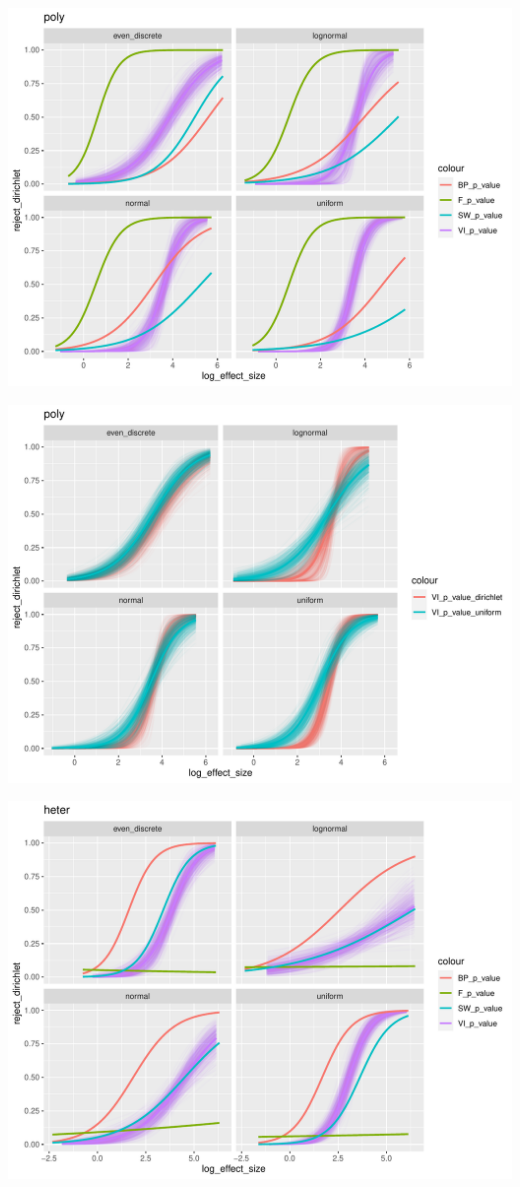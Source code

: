 \documentclass[]{interact}
\theoremstyle{plain}%
\theoremstyle{definition}
\theoremstyle{remark}
\begin{document}
\includegraphics[width=1\linewidth]{paper_comparison_files/figure-latex/unnamed-chunk-9-1}

\includegraphics[width=1\linewidth]{paper_comparison_files/figure-latex/unnamed-chunk-10-1}

\includegraphics[width=1\linewidth]{paper_comparison_files/figure-latex/unnamed-chunk-11-1}
\end{document}
